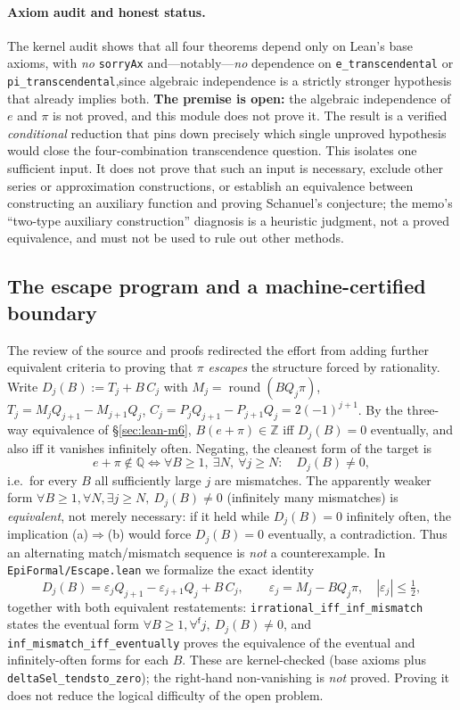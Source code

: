 \documentclass[11pt]{amsart}
\theoremstyle{definition}
\theoremstyle{remark}
\numberwithin{equation}{section}
\newcommand{\Q}{\mathbb{Q}}
\newcommand{\Z}{\mathbb{Z}}
\begin{document}
\paragraph{Axiom audit and honest status.} The kernel audit shows that all four theorems depend only on Lean's base axioms, with \emph{no} \texttt{sorryAx} and---notably---\emph{no} dependence on \texttt{e\_\allowbreak{}transcendental} or \texttt{pi\_\allowbreak{}transcendental},\allowbreak  since algebraic independence is a strictly stronger hypothesis that already implies both. \textbf{The premise is open:} the algebraic independence of $e$ and $\pi$ is not proved, and this module does not prove it. The result is a verified \emph{conditional} reduction that pins down precisely which single unproved hypothesis would close the four-combination transcendence question. This isolates one sufficient input. It does not prove that such an input is necessary, exclude other series or approximation constructions, or establish an equivalence between constructing an auxiliary function and proving Schanuel's conjecture; the memo's ``two-type auxiliary construction'' diagnosis is a heuristic judgment, not a proved equivalence, and must not be used to rule out other methods.

\subsection{The escape program and a machine-certified boundary}\label{sec:lean-escape}

The review of the source and proofs redirected the effort from adding further equivalent criteria to proving that $\pi$ \emph{escapes} the structure forced by rationality. Write $D_j(B):=T_j+B\,C_j$ with $M_j=\operatorname{round}(BQ_j\pi)$, $T_j=M_jQ_{j+1}-M_{j+1}Q_j$, $C_j=P_jQ_{j+1}-P_{j+1}Q_j=2(-1)^{j+1}$. By the three-way equivalence of \S\ref{sec:lean-m6}, $B(e+\pi)\in\Z$ iff $D_j(B)=0$ eventually, and also iff it vanishes infinitely often. Negating, the cleanest form of the target is
\[
e+\pi\notin\Q \iff \forall B\ge1,\ \exists N,\ \forall j\ge N:\quad D_j(B)\neq0,
\]
i.e.\ for every $B$ all sufficiently large $j$ are mismatches. The apparently weaker form $\forall B\ge1,\forall N,\exists j\ge N,\ D_j(B)\neq0$ (infinitely many mismatches) is \emph{equivalent}, not merely necessary: if it held while $D_j(B)=0$ infinitely often, the implication (a)$\Rightarrow$(b) would force $D_j(B)=0$ eventually, a contradiction. Thus an alternating match/mismatch sequence is \emph{not} a counterexample. In \texttt{EpiFormal/Escape.lean} we formalize the exact identity
\[
D_j(B)=\varepsilon_j Q_{j+1}-\varepsilon_{j+1}Q_j+B\,C_j,\qquad \varepsilon_j=M_j-BQ_j\pi,\quad|\varepsilon_j|\le\tfrac12,
\]
together with both equivalent restatements: \texttt{irrational\_iff\_inf\_mismatch} states the eventual form $\forall B\ge1,\forall^{\mathsf f}j,\ D_j(B)\neq0$, and \texttt{inf\_mismatch\_iff\_eventually} proves the equivalence of the eventual and infinitely-often forms for each $B$. These are kernel-checked (base axioms plus \texttt{deltaSel\_tendsto\_zero}); the right-hand non-vanishing is \emph{not} proved. Proving it does not reduce the logical difficulty of the open problem.
\end{document}
